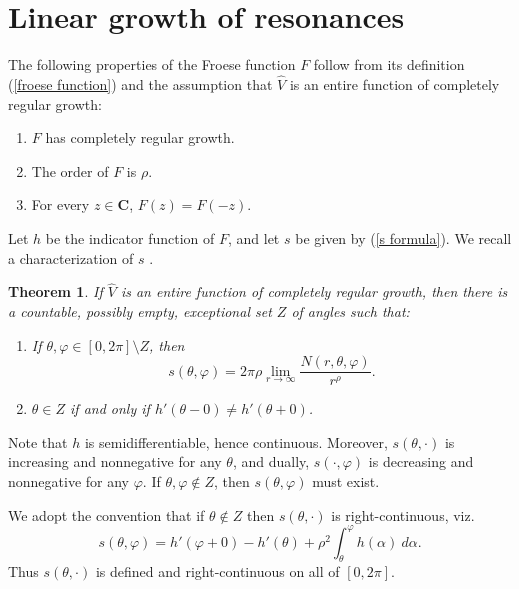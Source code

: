 \documentclass[reqno,12pt,letterpaper]{amsart}
\newcommand{\CC}{\mathbf{C}}
\newtheorem{theorem}{Theorem}[section]
\theoremstyle{definition}
\begin{document}
\section{Linear growth of resonances}
\label{linear growth}
The following properties of the Froese function $F$ follow from its definition (\ref{froese function}) and the assumption that $\widehat V$ is an entire function of completely regular growth:
\begin{enumerate}
\item $F$ has completely regular growth.
\item The order of $F$ is $\rho$.
\item For every $z \in \CC$, $F(z) = F(-z)$.
\end{enumerate}
Let $h$ be the indicator function of $F$, and let $s$ be given by (\ref{s formula}).
We recall a characterization of $s$ \cite[Theorem III.3]{levin1964distribution}.
\begin{theorem}
\label{zeroes of entire functions}
If $\widehat V$ is an entire function of completely regular growth, then there is a countable, possibly empty, exceptional set $Z$ of angles such that:
\begin{enumerate}
\item If $\theta, \varphi \in [0, 2\pi] \setminus Z$, then
$$s(\theta, \varphi) = 2\pi\rho \lim_{r\to\infty} \frac{N(r, \theta, \varphi)}{r^\rho}.$$
\item $\theta \in Z$ if and only if $h'(\theta - 0) \neq h'(\theta + 0)$.
\end{enumerate}
\end{theorem}
Note that $h$ is semidifferentiable, hence continuous.
Moreover, $s(\theta, \cdot)$ is increasing and nonnegative for any $\theta$, and dually, $s(\cdot, \varphi)$ is decreasing and nonnegative for any $\varphi$.
If $\theta, \varphi \notin Z$, then $s(\theta, \varphi)$ must exist.

We adopt the convention that if $\theta \notin Z$ then $s(\theta, \cdot)$ is right-continuous, viz.
$$s(\theta, \varphi) = h'(\varphi + 0) - h'(\theta) + \rho^2\int_\theta^\varphi h(\alpha)~d\alpha.$$
Thus $s(\theta, \cdot)$ is defined and right-continuous on all of $[0, 2\pi]$.
\end{document}
